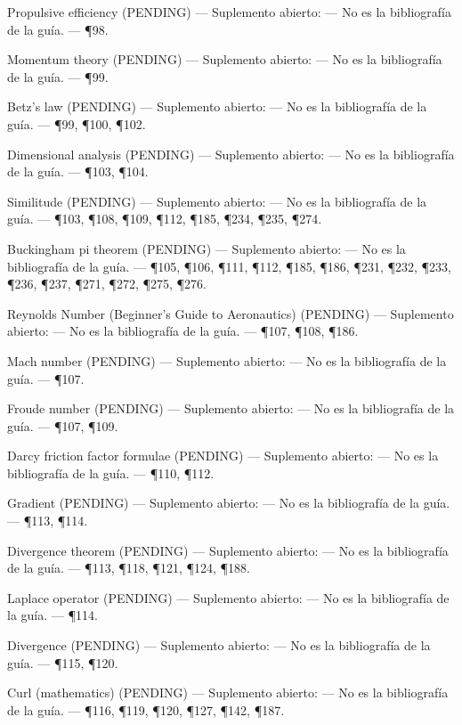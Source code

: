 \documentclass[10pt,openany]{book}
\begin{document}
\noindent Propulsive efficiency (PENDING) --- Suplemento abierto: --- No es la bibliografía de la guía. --- \P98.\par
\noindent Momentum theory (PENDING) --- Suplemento abierto: --- No es la bibliografía de la guía. --- \P99.\par
\noindent Betz's law (PENDING) --- Suplemento abierto: --- No es la bibliografía de la guía. --- \P99, \P100, \P102.\par
\noindent Dimensional analysis (PENDING) --- Suplemento abierto: --- No es la bibliografía de la guía. --- \P103, \P104.\par
\noindent Similitude (PENDING) --- Suplemento abierto: --- No es la bibliografía de la guía. --- \P103, \P108, \P109, \P112, \P185, \P234, \P235, \P274.\par
\noindent Buckingham pi theorem (PENDING) --- Suplemento abierto: --- No es la bibliografía de la guía. --- \P105, \P106, \P111, \P112, \P185, \P186, \P231, \P232, \P233, \P236, \P237, \P271, \P272, \P275, \P276.\par
\noindent Reynolds Number (Beginner's Guide to Aeronautics) (PENDING) --- Suplemento abierto: --- No es la bibliografía de la guía. --- \P107, \P108, \P186.\par
\noindent Mach number (PENDING) --- Suplemento abierto: --- No es la bibliografía de la guía. --- \P107.\par
\noindent Froude number (PENDING) --- Suplemento abierto: --- No es la bibliografía de la guía. --- \P107, \P109.\par
\noindent Darcy friction factor formulae (PENDING) --- Suplemento abierto: --- No es la bibliografía de la guía. --- \P110, \P112.\par
\noindent Gradient (PENDING) --- Suplemento abierto: --- No es la bibliografía de la guía. --- \P113, \P114.\par
\noindent Divergence theorem (PENDING) --- Suplemento abierto: --- No es la bibliografía de la guía. --- \P113, \P118, \P121, \P124, \P188.\par
\noindent Laplace operator (PENDING) --- Suplemento abierto: --- No es la bibliografía de la guía. --- \P114.\par
\noindent Divergence (PENDING) --- Suplemento abierto: --- No es la bibliografía de la guía. --- \P115, \P120.\par
\noindent Curl (mathematics) (PENDING) --- Suplemento abierto: --- No es la bibliografía de la guía. --- \P116, \P119, \P120, \P127, \P142, \P187.\par
\end{document}
